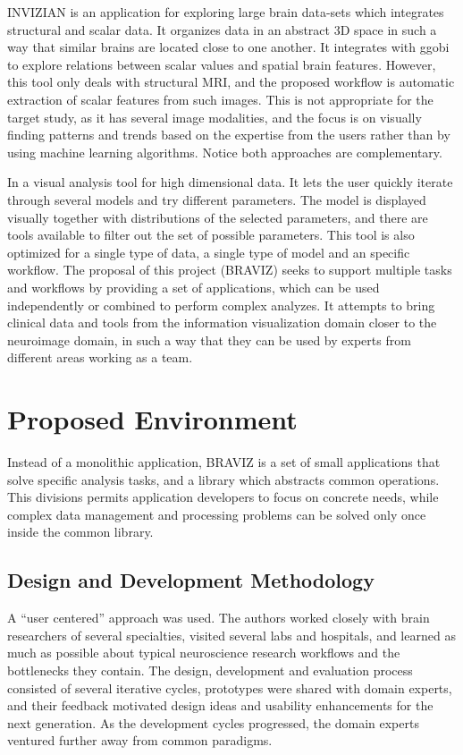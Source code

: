 \documentclass[utf8,paper]{frontiersSCNS} %
\begin{document}
INVIZIAN \citep{bowman_query-based_2011,bowman_feature-similarity_2012,bowman_visual_2012} is an application for exploring large brain data-sets which integrates structural and scalar data. It organizes data in an abstract 3D space in such a way that similar brains are located close to one another. It integrates with ggobi to explore relations between scalar values and spatial brain features. However, this tool only deals with structural MRI, and the proposed workflow is automatic extraction of scalar features from such images. This is not appropriate for the target study, as it has several image modalities, and the focus is on visually finding patterns and trends based on the expertise from the users rather than by using machine learning algorithms. Notice both approaches are complementary.

In \citep{hinterberg_peax:_2014} a visual analysis tool for high dimensional data. It lets the user quickly iterate through several models and try different parameters. The model is displayed visually together with distributions of the selected parameters, and there are tools available to filter out the set of possible parameters. This tool is also optimized for a single type of data, a single type of model and an specific workflow. The proposal of this project (BRAVIZ) seeks to support multiple tasks and workflows by providing a set of applications, which can be used independently or combined to perform complex analyzes. It attempts to bring clinical data and tools from the information visualization domain closer to the neuroimage domain, in such a way that they can be used by experts from different areas working as a team.


\section{Proposed Environment}

Instead of a monolithic application, BRAVIZ is a set of small applications that solve specific analysis tasks, and a library which abstracts common operations. This divisions permits application developers to focus on concrete needs, while complex data management and processing problems can be solved only once inside the common library. 

\subsection{Design and Development Methodology}

A ``user centered'' approach\citep{fernandez_user-centered_2013,wassink_applying_2009} was used. The authors worked closely with brain researchers of several specialties, visited several labs and hospitals, and learned as much as possible about typical neuroscience research workflows and the bottlenecks they contain. The design, development and evaluation process consisted of several iterative cycles, prototypes were shared with domain experts, and their feedback motivated design ideas and usability enhancements for the next generation. As the development cycles progressed, the domain experts ventured further away from common paradigms.
\end{document}
